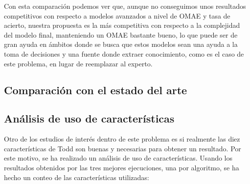 Con esta comparación podemos ver que, aunque no conseguimos unos resultados competitivos con respecto a modelos avanzados a nivel de OMAE y tasa de acierto, nuestra propuesta es la más competitiva con respecto a la complejidad del modelo final, manteniendo un OMAE bastante bueno, lo que puede ser de gran ayuda en ámbitos donde se busca que estos modelos sean una ayuda a la toma de decisiones y una fuente donde extraer conocimiento, como es el caso de este problema, en lugar de reemplazar al experto.

\newpage

\subsection{Comparación con el estado del arte}




\newpage


\subsection{Análisis de uso de características}

Otro de los estudios de interés dentro de este problema es si realmente las diez características de Todd son buenas y necesarias para obtener un resultado. Por este motivo, se ha realizado un análisis de uso de características. Usando los resultados obtenidos por las tres mejores ejecuciones, una por algoritmo, se ha hecho un conteo de las características utilizadas:

